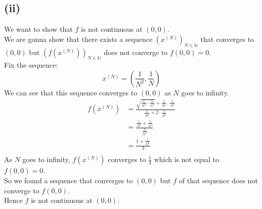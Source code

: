 \documentclass{article}
\begin{document}
\subsection*{(ii)}
We want to show that \(f\) is not continuous at \((0,0)\). \\
We are gonna show that there exists a sequence \((x^{(N)})_{N \in \mathbb{N}}\) that converges to \((0,0)\) but \((f(x^{(N)}))_{N \in \mathbb{N}}\) does not converge to \(f(0,0)=0\). \\
Fix the sequence:
\[   x^{(N)} = \left(\frac{1}{N^2}, \frac{1}{N}\right) \]
We can see that this sequence converges to \((0,0)\) as \(N\) goes to infinity.
\begin{align*}
   f(x^{(N)}) &= \frac{\sqrt{\frac{1}{N^2} \cdot \frac{1}{N^2}} + \frac{1}{N^2} \cdot \frac{1}{N^2}}{\frac{1}{N^2} + 2 \cdot \frac{1}{N^2}} \\
   &= \frac{\frac{1}{N^2} + \frac{1}{N^4}}{\frac{3}{N^2}} \\
   &= \frac{1 + \frac{1}{N^2}}{3} \\
\end{align*}
As \(N\) goes to infinity, \(f(x^{(N)})\) converges to \(\frac{1}{3}\) which is not equal to \(f(0,0)=0\). \\
So we found a sequence that converges to \((0,0)\) but \(f\) of that sequence does not converge to \(f(0,0)\). \\
Hence \(f\) is not continuous at \((0,0)\).
\end{document}
